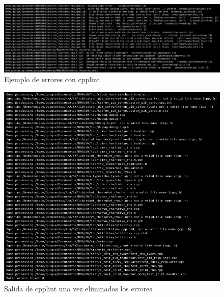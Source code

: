     \begin{figure}[H]
    	\centering
    	\includegraphics[width=1\textwidth]{figuras/Imagenes_SW/test/codificacion_2.png}   
    	\caption{Ejemplo de errores con cpplint}
    	\label{fig:SW:test:error_output_cpplint}
    \end{figure}
    
    \begin{figure}[H]
    	\centering
    	\includegraphics[width=1\textwidth]{figuras/Imagenes_SW/test/codificacion_3.png}   
    	\caption{Salida de cpplint una vez eliminados los errores}
    	\label{fig:SW:test:cpplint_ok}
    \end{figure}
